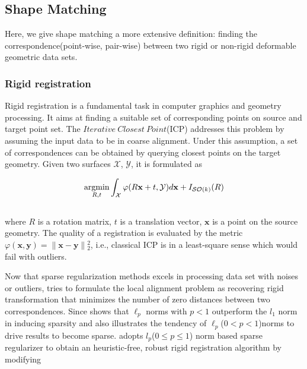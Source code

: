 \subsection{Shape Matching}
\label{subsec:Shape Matching}


Here, we give shape matching a more extensive definition: finding the correspondence(point-wise, pair-wise) between two rigid or non-rigid deformable geometric data sets.

\subsubsection{Rigid registration}
\label{subsubsec:Rigid registration}

Rigid registration is a fundamental task in computer graphics and geometry processing.
It aims at finding a suitable set of corresponding points on source and target point set.
The $Iterative~Closest~Point$(ICP) addresses this problem by assuming the input data to be in coarse alignment.
Under this assumption, a set of correspondences can be obtained by querying closest points on the target geometry.
Given two surfaces $\mathcal{X}$, $\mathcal{Y}$, it is formulated as

\small{
\begin{equation}
 \label{eq:ICP}
 \mathop{\operatorname*{argmin}}_{R,t}\int_{\mathcal{X}}^{}\varphi(R\mathbf{x}+t,\mathcal{Y})d\mathbf{x}+I_{\mathcal{SO}(k)}(R)
\end{equation}
}
\\
where $R$ is a rotation matrix,
$t$ is a translation vector,
$\mathbf{x}$ is a point on the source geometry.
The quality of a registration is evaluated by the metric $\varphi(\mathbf{x},\mathbf{y})=\|\mathbf{x}-\mathbf{y}\|{_2^2}$, i.e., classical ICP is in a least-square sense which would fail with outliers.

Now that sparse regularization methods excels in processing data set with noises or outliers,
\cite{bouaziz2013sparse} tries to formulate the local alignment problem as recovering rigid transformation that minimizes the number of zero distances between two correspondences.
Since \cite{chartrand2007exact} shows that $\ell_{p}$ norms with $p<1$ outperform the $l_1$ norm in inducing sparsity and \cite{elad2010sparse} also illustrates the tendency of $\ell_{p}$($0<p<1$)norms to drive results to become sparse.
\cite{bouaziz2013sparse} adopts $l_{p}$($0\le p\le1$) norm based sparse regularizer to obtain an heuristic-free, robust rigid registration algorithm by modifying

